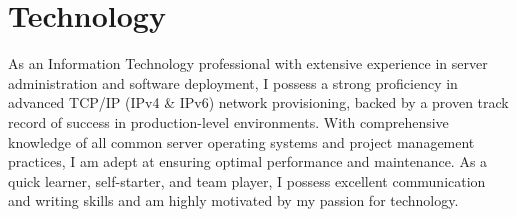 \documentclass[a4paper]{article}
\begin{document}
\section{Technology}
\begin{minipage}{\textwidth}
As an Information Technology professional with extensive experience in server administration and software deployment, I possess a strong proficiency in advanced TCP/IP (IPv4 \& IPv6) network provisioning, backed by a proven track record of success in production-level environments. With comprehensive knowledge of all common server operating systems and project management practices, I am adept at ensuring optimal performance and maintenance. As a quick learner, self-starter, and team player, I possess excellent communication and writing skills and am highly motivated by my passion for technology.
\end{minipage}
\end{document}
